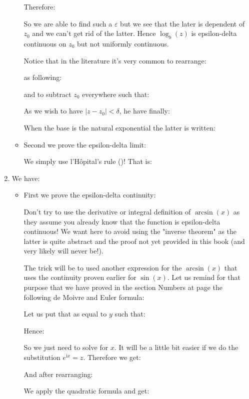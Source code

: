 \begin{enumerate}
\begin{itemize}
			Therefore:
			
			So we are able to find such a $\varepsilon$ but we see that the later is dependent of $z_0$ and we can't get rid of the latter. Hence $\log_b(z)$ is epsilon-delta continuous on $z_0$ but not uniformly continuous.
			
			Notice that in the literature it's very common to rearrange:
			
			as following:
			
			and to subtract $z_0$ everywhere such that:
			
			As we wish to have $|z-z_0|<\delta$, he have finally:
			
			When the base is the natural exponential the latter is written:
			
			
			\item Second we prove the epsilon-delta limit:
			
			We simply use l'Hôpital's rule ()! That is:
			
		\end{itemize}
		
		\item We have:
		
		
		\begin{itemize}
			\item First we prove the epsilon-delta continuity:
			
			Don't try to use the derivative or integral definition of $\arcsin(x)$ as they assume you already know that the function is epsilon-delta continuous! We want here to avoid using the "inverse theorem" as the latter is quite abstract and the proof not yet provided in this book (and very likely will never be!).
			
			The trick will be to used another expression for the $\arcsin(x)$ that uses the continuity proven earlier for $\sin(x)$. Let us remind for that purpose that we have proved in the section Numbers at page \pageref{de Moivre and Euler formulas} the following de Moivre and Euler formula:
			
			Let us put that as equal to $y$ such that:
			
			Hence:
			
			So we just need to solve for $x$. It will be a little bit easier if we do the substitution $e^{\mathrm{i}x}=z$. Therefore we get:
			
			And after rearranging:
			
			We apply the quadratic formula and get:
			

\end{itemize}
\end{enumerate}

